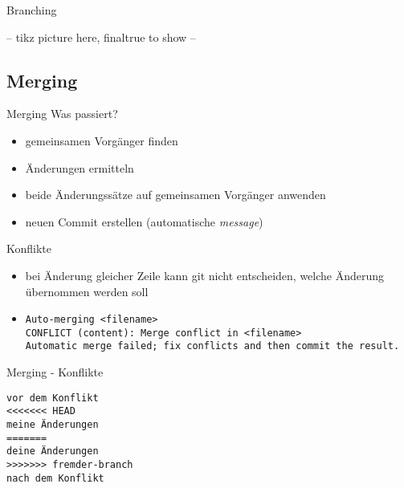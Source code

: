 \begin{frame}{Branching}
{
    }
\else
    -- tikz picture here, finaltrue to show --
\fi
\end{frame}

\subsection{Merging}
\begin{frame}{Merging}
    Was passiert?
    \begin{itemize}
        \item gemeinsamen Vorgänger finden
        \item Änderungen ermitteln
        \item beide Änderungssätze auf gemeinsamen Vorgänger anwenden
        \item neuen Commit erstellen (automatische \emph{message})
    \end{itemize}

    Konflikte
    \begin{itemize}
        \item bei Änderung gleicher Zeile kann git nicht entscheiden, welche
            Änderung übernommen werden soll
        \item
            {\scriptsize
            \texttt{Auto-merging <filename>}\\
            \texttt{CONFLICT (content): Merge conflict in <filename>}\\
            \texttt{Automatic merge failed; fix conflicts and then commit the result.}\\
            }
    \end{itemize}
\end{frame}

\begin{frame}[fragile]{Merging - Konflikte}

    \begin{verbatim}
vor dem Konflikt
<<<<<<< HEAD
meine Änderungen
=======
deine Änderungen
>>>>>>> fremder-branch
nach dem Konflikt
    \end{verbatim}
\end{frame}

